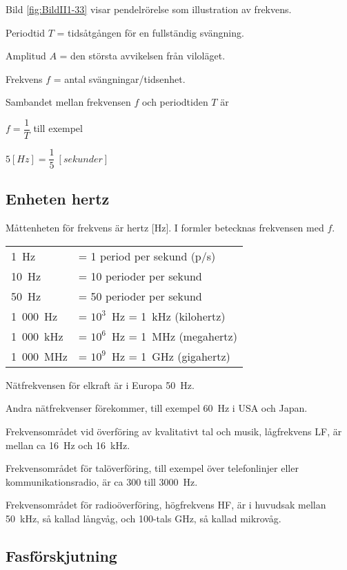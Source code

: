 Bild \ref{fig:BildII1-33} visar pendelrörelse som illustration av frekvens.

Periodtid \(T\) = tidsåtgången för en fullständig svängning.

Amplitud \(A\) = den största avvikelsen från viloläget.

Frekvens \(f\) = antal svängningar/tidsenhet.

Sambandet mellan frekvensen \(f\) och periodtiden \(T\) är

\(f=\dfrac{1}{T}\) till exempel

\(5 [H z] = \dfrac{1}{5}\ [sekunder]\)

\subsection{Enheten hertz}

Måttenheten för frekvens är hertz [Hz].
I formler betecknas frekvensen med \(f\).

\begin{center}
\begin{tabular}{ll}
1~Hz      & = 1 period per sekund (p/s) \\
10~Hz     & = 10 perioder per sekund \\
50~Hz     & = 50 perioder per sekund \\
1~000~Hz  & = \(10^3\)~Hz = 1~kHz (kilohertz) \\
1~000~kHz & = \(10^6\)~Hz = 1~MHz (megahertz) \\
1~000~MHz & = \(10^9\)~Hz = 1~GHz (gigahertz) \\
\end{tabular}
\end{center}

Nätfrekvensen för elkraft är i Europa 50~Hz.

Andra nätfrekvenser förekommer, till exempel 60~Hz i USA och Japan.

Frekvensområdet vid överföring av kvalitativt tal och musik, lågfrekvens LF, är
mellan ca 16~Hz och 16~kHz.

Frekvensområdet för talöverföring, till exempel över telefonlinjer eller
kommunikationsradio, är ca 300 till 3000~Hz.

Frekvensområdet för radioöverföring, högfrekvens HF, är i huvudsak mellan
50~kHz, så kallad långvåg, och 100-tals GHz, så kallad mikrovåg.

\subsection{Fasförskjutning}


